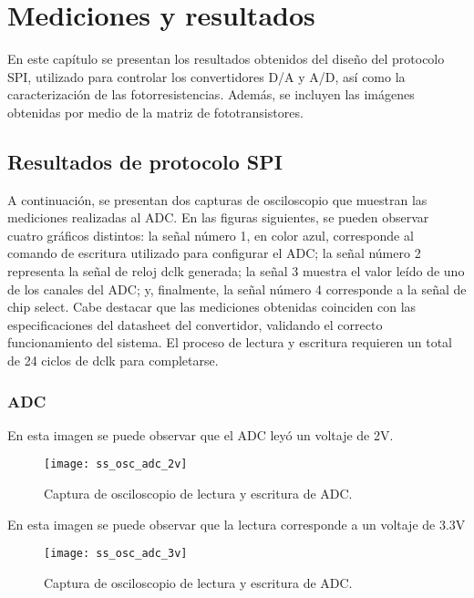 \chapter{Mediciones y resultados}
En este capítulo se presentan los resultados obtenidos del diseño del protocolo SPI, utilizado para controlar los convertidores D/A y A/D, así como la caracterización de las fotorresistencias. Además, se incluyen las imágenes obtenidas por medio de la matriz de fototransistores.


\section{Resultados de protocolo SPI}
A continuación, se presentan dos capturas de osciloscopio que muestran las mediciones realizadas al ADC. En las figuras siguientes, se pueden observar cuatro gráficos distintos: la señal número 1, en color azul, corresponde al comando de escritura utilizado para configurar el ADC; la señal número 2 representa la señal de reloj dclk generada; la señal 3 muestra el valor leído de uno de los canales del ADC; y, finalmente, la señal número 4 corresponde a la señal de chip select. Cabe destacar que las mediciones obtenidas coinciden con las especificaciones del datasheet del convertidor, validando el correcto funcionamiento del sistema. El proceso de lectura y escritura requieren un total de 24 ciclos de dclk para completarse.

\subsection{ADC}
En esta imagen se puede observar que el ADC leyó un voltaje de 2V.

            \begin{figure}[hbtp]
                \centering
                \texttt{[image: ss\_osc\_adc\_2v]}
                \caption{Captura de osciloscopio de lectura y escritura de ADC.}
                \label{fig:ss_osc_adc_2v}
            \end{figure} 

En esta imagen se puede observar que la lectura corresponde a un voltaje de 3.3V
            \begin{figure}[hbtp]
                \centering
                \texttt{[image: ss\_osc\_adc\_3v]}
                \caption{Captura de osciloscopio de lectura y escritura de ADC.}
                \label{fig:ss_osc_adc_3v}
            \end{figure} 

